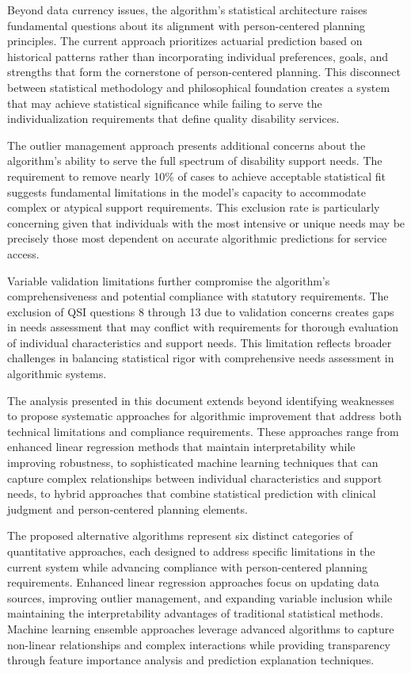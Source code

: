 \documentclass[12pt]{article}
\begin{document}
Beyond data currency issues, the algorithm's statistical architecture raises fundamental questions about its alignment with person-centered planning principles. The current approach prioritizes actuarial prediction based on historical patterns rather than incorporating individual preferences, goals, and strengths that form the cornerstone of person-centered planning. This disconnect between statistical methodology and philosophical foundation creates a system that may achieve statistical significance while failing to serve the individualization requirements that define quality disability services.

The outlier management approach presents additional concerns about the algorithm's ability to serve the full spectrum of disability support needs. The requirement to remove nearly 10\% of cases to achieve acceptable statistical fit suggests fundamental limitations in the model's capacity to accommodate complex or atypical support requirements. This exclusion rate is particularly concerning given that individuals with the most intensive or unique needs may be precisely those most dependent on accurate algorithmic predictions for service access.

Variable validation limitations further compromise the algorithm's comprehensiveness and potential compliance with statutory requirements. The exclusion of QSI questions 8 through 13 due to validation concerns creates gaps in needs assessment that may conflict with requirements for thorough evaluation of individual characteristics and support needs. This limitation reflects broader challenges in balancing statistical rigor with comprehensive needs assessment in algorithmic systems.

The analysis presented in this document extends beyond identifying weaknesses to propose systematic approaches for algorithmic improvement that address both technical limitations and compliance requirements. These approaches range from enhanced linear regression methods that maintain interpretability while improving robustness, to sophisticated machine learning techniques that can capture complex relationships between individual characteristics and support needs, to hybrid approaches that combine statistical prediction with clinical judgment and person-centered planning elements.

The proposed alternative algorithms represent six distinct categories of quantitative approaches, each designed to address specific limitations in the current system while advancing compliance with person-centered planning requirements. Enhanced linear regression approaches focus on updating data sources, improving outlier management, and expanding variable inclusion while maintaining the interpretability advantages of traditional statistical methods. Machine learning ensemble approaches leverage advanced algorithms to capture non-linear relationships and complex interactions while providing transparency through feature importance analysis and prediction explanation techniques.
\end{document}
